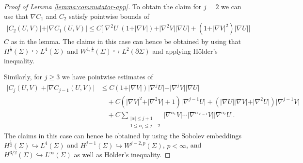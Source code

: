 \documentclass[10pt,reqno]{amsart}
\theoremstyle{plain}
\theoremstyle{definition}
\numberwithin{equation}{section}
\newcommand{\al}{\alpha}
\newcommand{\Si}{\Sigma}
\newcommand{\beqas}{\begin{equation*}\begin{aligned}}
\newcommand{\eeqas}{\end{aligned}\end{equation*}}
\newcommand{\half}{\frac{1}{2}}
\newcommand{\abs}[1]{\vert#1\vert}
\newcommand{\na}{\nabla}
\newcommand{\pSi}{{\partial \Sigma}}
\begin{document}
\begin{proof}[Proof of Lemma \ref{lemma:commutator-app}]
To obtain the claim for $j=2$ we can use that $\na C_1$ and $C_2$ satisfy pointwise bounds of
\beqas %
    \abs{C_2(U,V)}+\abs{\na C_1(U,V)} \leq C\big[ \abs{\na^2 U}(1+\abs{\na V}) +\abs{\na^2 V}\abs{\na U}+(1+\abs{\na V}^2)\abs{\na U}\big]
\eeqas
$C$ as in the lemma. The claims in this case can hence be obtained by using that $H^\half(\Si)\hookrightarrow L^4(\Si)$ and $W^{1,\frac{4}{3}}(\Si)\hookrightarrow L^2(\pSi)$ and applying H\"older's inequality.

Similarly, for $j\geq 3$ we have pointwise estimates of 
\beqas %
    \abs{C_j(U,V) }+\abs{\na C_{j-1}(U,V)} &\leq C (1+\abs{\na V}) \abs{\na^{j} U}+\abs{\na^{j} V}\abs{\na U}\\
    &\quad+C(\abs{\na V}^2+\abs{\na^2 V}+1) \abs{\na^{j-1} U}+(\abs{\na U}\abs{\na V}+\abs{\na^2 U})\abs{\na^{j-1} V}\\
    & \quad +C \sum_{\substack{\abs{\al} \leq j+1 \\ 1\leq \al_i \leq j-2}}\abs{\nabla^{\al_1} V}\cdots\abs{\nabla^{\al_{\ell-1}}V} \abs{\nabla^{\al_\ell} U}.
\eeqas
The claims in this case can hence be obtained by using the Sobolev embeddings $H^\half(\Si)\hookrightarrow L^4(\Si)$ and $H^{j-1}(\Si)\hookrightarrow W^{j-2,p}(\Si)$, $p<\infty$, and  $H^{3/2}(\Si)\hookrightarrow L^\infty(\Si)$  as well as H\"older's inequality. 
\end{proof}
\end{document}
